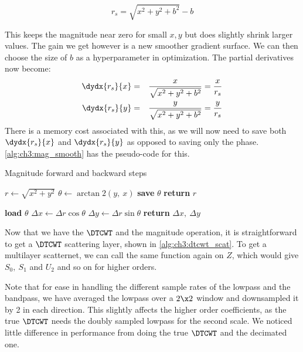 \begin{equation}\label{eq:ch3:magbias}
 r_s = \sqrt{x^2 + y^2 + b^2} - b
\end{equation}

This keeps the magnitude near zero for small $x,y$ but does slightly shrink larger
values. The gain we get however is a new smoother gradient surface.
We can then choose the size of $b$ as a hyperparameter in
optimization. The partial derivatives now become:
\begin{eqnarray}
  \dydx{r_s}{x} & = & \frac{x}{\sqrt{x^2 + y^2+b^2}} = \frac{x}{r_s}\\
  \dydx{r_s}{y} & = & \frac{y}{\sqrt{x^2 + y^2+b^2}} = \frac{y}{r_s} 
\end{eqnarray}
There is a memory cost associated with this, as we will now need to save both
$\dydx{r_s}{x}$ and $\dydx{r_s}{y}$ as opposed to saving only the phase.
\autoref{alg:ch3:mag_smooth} has the pseudo-code for this.

\begin{algorithm}[tb]
\caption{Magnitude forward and backward steps}\label{alg:ch3:mag}
\begin{algorithmic}[1]
  \State $r \gets \sqrt{x^2 + y^2}$
  \State $\theta \gets \arctan2(y,\ x)$ 
  \State \textbf{save} $\theta$ 
  \State \textbf{return} $r$
\EndFunction
\end{algorithmic}\vspace{10pt}
\begin{algorithmic}[1]
  \State \textbf{load} $\theta$
  \State $\Delta x \gets \Delta r \cos{\theta}$ 
  \State $\Delta y \gets \Delta r \sin{\theta}$ 
  \State \textbf{return} $\Delta x,\ \Delta y$
\EndFunction
\end{algorithmic}
\end{algorithm}

Now that we have the $\DTCWT$ and the magnitude operation, it is straightforward
to get a $\DTCWT$ scattering layer, shown in \autoref{alg:ch3:dtcwt_scat}. To
get a multilayer scatternet, we can call the same function again on $Z$, which
would give $S_0,\ S_1$ and $U_2$ and so on for higher orders. 

Note that for ease in handling the different sample rates of the lowpass and the
bandpass, we have averaged the lowpass over a $2\x 2$ window and downsampled it
by 2 in each direction. This slightly
affects the higher order coefficients, as the true $\DTCWT$ needs the doubly
sampled lowpass for the second scale. We noticed little difference in
performance from doing the true $\DTCWT$ and the decimated one.

